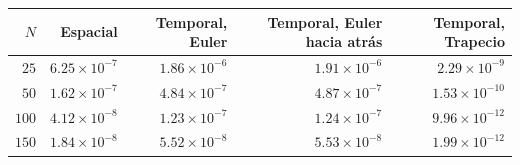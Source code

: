 \begin{tabular}{r r r r r}
\toprule
\rowcolor{Azul1!50}
$N$ & Espacial & Temporal, Euler & Temporal, Euler hacia atrás & Temporal, Trapecio \\
\midrule
$25$ & $6.25\times10^{-7}$ & $1.86\times10^{-6}$ & $1.91\times10^{-6}$ & $2.29\times10^{-9}$ \\
$50$ & $1.62\times10^{-7}$ & $4.84\times10^{-7}$ & $4.87\times10^{-7}$ & $1.53\times10^{-10}$ \\
$100$ & $4.12\times10^{-8}$ & $1.23\times10^{-7}$ & $1.24\times10^{-7}$ & $9.96\times10^{-12}$ \\
$150$ & $1.84\times10^{-8}$ & $5.52\times10^{-8}$ & $5.53\times10^{-8}$ & $1.99\times10^{-12}$ \\
\bottomrule
\end{tabular}
